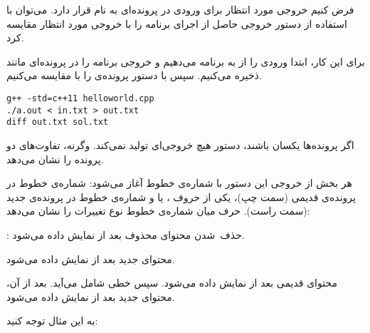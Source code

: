 \documentclass{utsignal}
\begin{document}
    فرض کنیم خروجی مورد انتظار برای ورودی  در پرونده‌ای به نام  قرار دارد. می‌توان با استفاده از دستور  خروجی حاصل از اجرای برنامه را با خروجی مورد انتظار مقایسه کرد.

    برای این کار، ابتدا ورودی را از  به برنامه می‌دهیم و خروجی برنامه را در پرونده‌ای مانند  ذخیره می‌کنیم. سپس با دستور  پرونده‌ی  را با  مقایسه می‌کنیم.
    \begin{latin}%
    \begin{Verbatim}[fontsize=\small]
g++ -std=c++11 helloworld.cpp
./a.out < in.txt > out.txt
diff out.txt sol.txt
    \end{Verbatim}
    \end{latin}

    اگر پرونده‌ها یکسان باشند، دستور  هیچ خروجی‌ای تولید نمی‌کند. وگرنه، تفاوت‌های دو پرونده را نشان می‌دهد.

    هر بخش از خروجی این دستور با شماره‌ی خطوط آغاز می‌شود: شماره‌ی خطوط در پرونده‌ی قدیمی (سمت چپ)، یکی از حروف ،  یا  و شماره‌ی خطوط در پرونده‌ی جدید (سمت راست). حرف میان شماره‌ی خطوط نوع تغییرات را نشان می‌دهد:
    \begin{description}[leftmargin=8em,style=nextline,font=\labelitemi\quad\bfseries]
        \item[\lr{\texttt{d}}: حذف~شدن]
        محتوای محذوف بعد از \lr{\lstinline[language=Octave]{<}} نمایش داده می‌شود.
        \item[\lr{\texttt{a}}: افزوده~شدن]
        محتوای جدید بعد از \lr{\lstinline[language=Octave]{>}} نمایش داده می‌شود.
        \item[\lr{\texttt{c}}: تغییر]
        محتوای قدیمی بعد از \lr{\lstinline[language=Octave]{<}} نمایش داده می‌شود.
        سپس خطی شامل \lr{\lstinline[language=Octave]{---}} می‌آید.
        بعد از آن، محتوای جدید بعد از \lr{\lstinline[language=Octave]{>}} نمایش داده می‌شود.
    \end{description}

    به این مثال توجه کنید:
    
\end{document}
